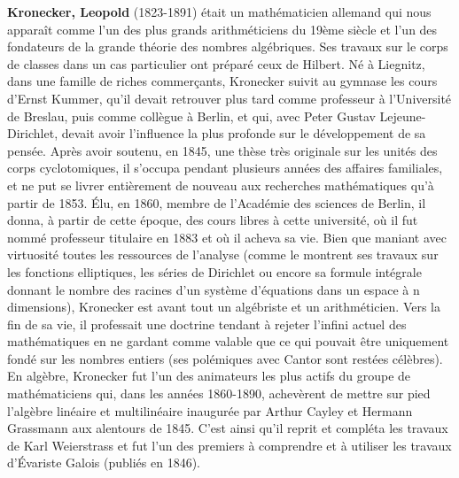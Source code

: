 \textbf{Kronecker, Leopold} (1823-1891) était un mathématicien allemand qui nous apparaît comme l'un des plus grands arithméticiens du 19ème siècle et l'un des fondateurs de la grande théorie des nombres algébriques. Ses travaux sur le corps de classes dans un cas particulier ont préparé ceux de Hilbert. Né à Liegnitz, dans une famille de riches commerçants, Kronecker suivit au gymnase les cours d'Ernst Kummer, qu'il devait retrouver plus tard comme professeur à l'Université de Breslau, puis comme collègue à Berlin, et qui, avec Peter Gustav Lejeune-Dirichlet, devait avoir l'influence la plus profonde sur le développement de sa pensée. Après avoir soutenu, en 1845, une thèse très originale sur les unités des corps cyclotomiques, il s'occupa pendant plusieurs années des affaires familiales, et ne put se livrer entièrement de nouveau aux recherches mathématiques qu'à partir de 1853. Élu, en 1860, membre de l'Académie des sciences de Berlin, il donna, à partir de cette époque, des cours libres à cette université, où il fut nommé professeur titulaire en 1883 et où il acheva sa vie. Bien que maniant avec virtuosité toutes les ressources de l'analyse (comme le montrent ses travaux sur les fonctions elliptiques, les séries de Dirichlet ou encore sa formule intégrale donnant le nombre des racines d'un système d'équations dans un espace à n dimensions), Kronecker est avant tout un algébriste et un arithméticien. Vers la fin de sa vie, il professait une doctrine tendant à rejeter l'infini actuel des mathématiques en ne gardant comme valable que ce qui pouvait être uniquement fondé sur les nombres entiers (ses polémiques avec Cantor sont restées célèbres). En algèbre, Kronecker fut l'un des animateurs les plus actifs du groupe de mathématiciens qui, dans les années 1860-1890, achevèrent de mettre sur pied l'algèbre linéaire et multilinéaire inaugurée par Arthur Cayley et Hermann Grassmann aux alentours de 1845. C'est ainsi qu'il reprit et compléta les travaux de Karl Weierstrass et fut l'un des premiers à comprendre et à utiliser les travaux d'Évariste Galois (publiés en 1846).

{}
\label{sec:L}

